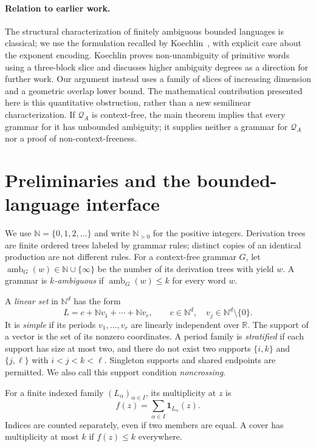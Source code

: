 \documentclass[a4paper,USenglish,cleveref,autoref]{lipics-v2021}
\newcommand{\N}{\mathbb N}
\newcommand{\R}{\mathbb R}
\newcommand{\Q}{\mathcal Q}
\newcommand{\amb}{\operatorname{amb}}
\begin{document}
\paragraph{Relation to earlier work.}
The structural characterization of finitely ambiguous bounded languages is classical; we use the formulation recalled by Koechlin~\cite[p.~41:16]{Koechlin2022}, with explicit care about the exponent encoding.
Koechlin proves non-unambiguity of primitive words using a three-block slice and discusses higher ambiguity degrees as a direction for further work.
Our argument instead uses a family of slices of increasing dimension and a geometric overlap lower bound.
The mathematical contribution presented here is this quantitative obstruction, rather than a new semilinear characterization.
If $\Q_A$ is context-free, the main theorem implies that every grammar for it has unbounded ambiguity; it supplies neither a grammar for $\Q_A$ nor a proof of non-context-freeness.

\section{Preliminaries and the bounded-language interface}
We use $\N=\{0,1,2,\ldots\}$ and write $\N_{>0}$ for the positive integers.
Derivation trees are finite ordered trees labeled by grammar rules; distinct copies of an identical production are not different rules.
For a context-free grammar $G$, let $\amb_G(w)\in\N\cup\{\infty\}$ be the number of its derivation trees with yield $w$.
A grammar is \emph{$k$-ambiguous} if $\amb_G(w)\leq k$ for every word $w$.

A \emph{linear set} in $\N^d$ has the form
\begin{equation}\label{eq:linear}
 L=c+\N v_1+\cdots+\N v_r,
 \qquad c\in\N^d,\quad v_j\in\N^d\setminus\{0\}.
\end{equation}
It is \emph{simple} if its periods $v_1,\ldots,v_r$ are linearly independent over $\R$.
The support of a vector is the set of its nonzero coordinates.
A period family is \emph{stratified} if each support has size at most two, and there do not exist two supports $\{i,k\}$ and $\{j,\ell\}$ with $i<j<k<\ell$.
Singleton supports and shared endpoints are permitted.
We also call this support condition \emph{noncrossing}.

For a finite indexed family $(L_\alpha)_{\alpha\in I}$, its multiplicity at $z$ is
\begin{equation}\label{eq:ply}
 f(z)=\sum_{\alpha\in I}\mathbf 1_{L_\alpha}(z).
\end{equation}
Indices are counted separately, even if two members are equal.
A cover has multiplicity at most $k$ if $f(z)\leq k$ everywhere.
\end{document}
